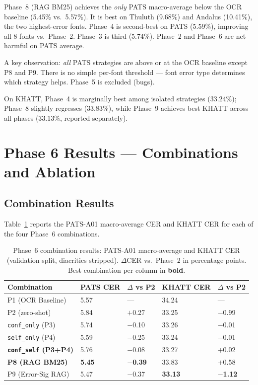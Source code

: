 Phase~8 (RAG BM25) achieves the \emph{only} PATS macro-average below the OCR
baseline (5.45\% vs.\ 5.57\%). It is best on Thuluth (9.68\%) and Andalus
(10.41\%), the two highest-error fonts. Phase~4 is second-best on PATS
(5.59\%), improving all 8 fonts vs.\ Phase~2. Phase~3 is third (5.74\%).
Phase~2 and Phase~6 are net harmful on PATS average.

A key observation: \emph{all} PATS strategies are above or at the OCR
baseline except P8 and P9. There is no simple per-font threshold --- font
error type determines which strategy helps. Phase~5 is excluded (bugs).

On KHATT, Phase~4 is marginally best among isolated strategies (33.24\%);
Phase~8 slightly regresses (33.83\%), while Phase~9 achieves best KHATT
across all phases (33.13\%, reported separately).

\section{Phase 6 Results --- Combinations and Ablation}
\label{sec:res_phase6}

\subsection{Combination Results}
\label{subsec:res_p6_combos}

Table~\ref{tab:p6_combos} reports the PATS-A01 macro-average CER and KHATT
CER for each of the four Phase~6 combinations.

\begin{table}[htbp]
  \centering
  \caption{Phase~6 combination results: PATS-A01 macro-average and KHATT CER
           (validation split, diacritics stripped). $\Delta$CER vs.\ Phase~2
           in percentage points. Best combination per column in \textbf{bold}.}
  \label{tab:p6_combos}
  \begin{tabularx}{\textwidth}{lXXXX}
    \toprule
    \textbf{Combination} & \textbf{PATS CER} & \textbf{$\Delta$ vs P2}
      & \textbf{KHATT CER} & \textbf{$\Delta$ vs P2} \\
    \midrule
    P1 (OCR Baseline)           &  5.57 & ---   & 34.24 & --- \\
    P2 (zero-shot)              &  5.84 & $+$0.27 & 33.25 & $-$0.99 \\
    \texttt{conf\_only} (P3)    &  5.74 & $-$0.10 & 33.26 & $-$0.01 \\
    \texttt{self\_only} (P4)    &  5.59 & $-$0.25 & 33.24 & $-$0.01 \\
    \textbf{\texttt{conf\_self} (P3+P4)}
                                &  5.76 & $-$0.08 & 33.27 & $+$0.02 \\
    \textbf{P8 (RAG BM25)}      & \textbf{5.45} & \textbf{$-$0.39} & 33.83 & $+$0.58 \\
    P9 (Error-Sig RAG)          &  5.47 & $-$0.37 & \textbf{33.13} & \textbf{$-$1.12} \\
    \bottomrule
  \end{tabularx}
\end{table}

